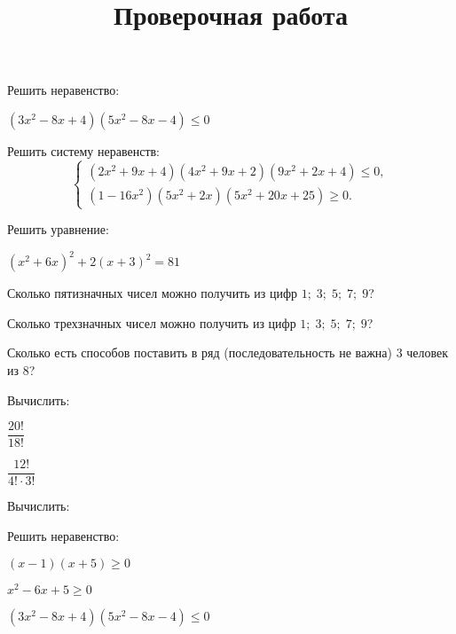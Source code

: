 \begin{listofex}
\begin{enumcols}[itemcolumns=2]
	\end{enumcols}
	\item Решить неравенство:
	\begin{enumcols}[itemcolumns=1]
		\item {}
		\item \( (3x^2-8x+4)(5x^2-8x-4)\le0 \)
	\end{enumcols}
	\item Решить систему неравенств:
	\[ \left\{
	\begin{array}{l}
		(2x^2+9x+4)(4x^2+9x+2)(9x^2+2x+4)\le0,\\
		(1-16x^2)(5x^2+2x)(5x^2+20x+25)\ge0.
	\end{array}
	\right. \]
\end{listofex}
\newpage
\title{Проверочная работа}
\begin{listofex}
	\item Решить уравнение:
	\begin{enumcols}[itemcolumns=2]
		\item {}
		\item {}
		\item \( (x^2+6x)^2+2(x+3)^2=81 \) 
		\item {}
	\end{enumcols}
	\item Сколько пятизначных чисел можно получить из цифр \( 1;\;3;\;5;\;7;\;9 \)?
	\item Сколько трехзначных чисел можно получить из цифр \( 1;\;3;\;5;\;7;\;9 \)?
	\item Сколько есть способов поставить в ряд (последовательность не важна) 3 человек из 8?
	\item Вычислить:
	\begin{enumcols}[itemcolumns=2]
		\item \( \dfrac{20!}{18!} \) 
		\item \( \dfrac{12!}{4!\cdot3!} \) 
	\end{enumcols}
	\item Вычислить:
	\begin{enumcols}[itemcolumns=2]
		\item {}
		\item {}
	\end{enumcols}
	\item {}
	\item Решить неравенство:
	\begin{enumcols}[itemcolumns=2]
		\item \( (x-1)(x+5)\ge0 \) \answer{\( [-12;0,5] \)}
		\item \( x^2-6x+5\ge0 \) \answer{\( (-\infty;1]\cup[18;+\infty) \)}
		\item \( (3x^2-8x+4)(5x^2-8x-4)\le0 \)
	\end{enumcols}
\end{listofex}
